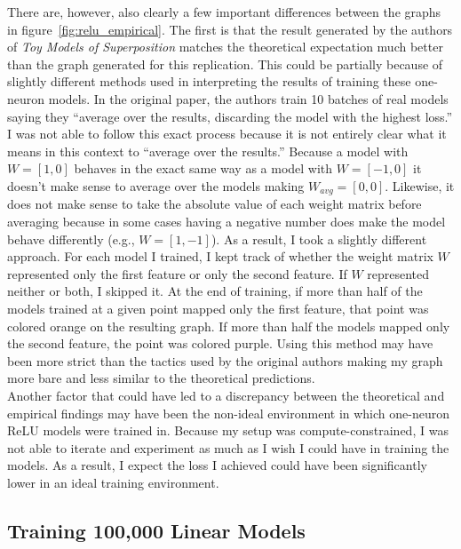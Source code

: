 \documentclass{article} %
\begin{document}
There are, however, also clearly a few important differences between the graphs in
figure~\ref{fig:relu_empirical}. The first is that the result generated by the
authors of \textit{Toy Models of Superposition} matches the theoretical
expectation much better than the graph generated for this replication. This could
be partially because of slightly different methods used in interpreting the results
of training these one-neuron models. In the original paper, the authors train
10 batches of real models saying they ``average over the results, discarding 
the model with the highest loss.'' I was not able to follow this exact process
because it is not entirely clear what it means in this context to ``average over
the results.'' Because a model with $W = [1, 0]$ behaves in the exact same way as
a model with
$W = [-1, 0]$ it doesn't make sense to average over the models making 
$W_{avg} = [0, 0]$. Likewise, it does not make sense to take the absolute value
of each weight matrix before averaging because in some cases having a negative
number does make the model behave differently (e.g., $W = [1, -1]$). As a result,
I took a slightly different approach. For each model I trained, I kept track of
whether the weight matrix $W$ represented only the first feature or only the second feature.
If $W$ represented neither or both, I skipped it. At the end of training, if more
than half of the models trained at a given point mapped only the first feature,
that point was colored orange on the resulting graph. If more than half the models
mapped only the second feature,
the point was colored purple. Using this method may have been more strict than
the tactics used by the original authors making my graph more bare and less similar to the
theoretical predictions.\\

Another factor that could have led to a discrepancy between the theoretical
and empirical findings may have been the non-ideal environment in which
one-neuron ReLU models were trained in. Because my setup was compute-constrained,
I was not able to iterate and experiment as much as I wish I could have in training 
the models. As a result, I expect the loss I achieved could have been significantly
lower in an ideal training environment.

\subsection{Training 100,000 Linear Models}
\label{sec:hundredk_linear}
\end{document}
